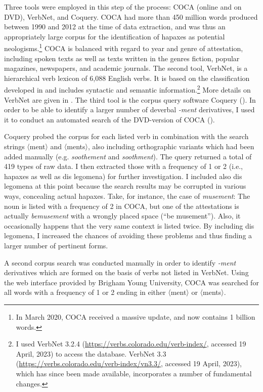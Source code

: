 Three tools were employed in this step of the process: COCA (online and on DVD), VerbNet, and Coquery.
COCA had more than 450 million words produced between 1990 and 2012 at the time of data extraction, and was thus an appropriately large corpus for the identification of hapaxes as potential neologisms.\footnote{In March 2020, COCA received a massive update, and now contains 1 billion words.} COCA is balanced with regard to year and genre of attestation, including spoken texts as well as texts written in the genres fiction, popular magazines, newspapers, and academic journals. 
The second tool, VerbNet, is a hierarchical verb lexicon of 6,088 English verbs. It is based on the classification developed in \citet{Levin.1993} and includes syntactic and semantic information.\footnote{I used VerbNet 3.2.4 (\url{https://verbs.colorado.edu/verb-index/}, accessed 19 April, 2023) to access the database. VerbNet 3.3 (\url{https://verbs.colorado.edu/verb-index/vn3.3/}, accessed 19 April, 2023), which has since been made available, incorporates a number of fundamental changes.} 
More details on VerbNet are given in .
The third tool is the corpus query software Coquery (\citealt{Kunter.2015}). In order to be able to identify a larger number of deverbal \textit{-ment} derivatives, I used it to conduct an automated search of the DVD-version of COCA (\citealt{Davies.2008b}).

Coquery probed the corpus for each listed verb in combination with the search strings 〈ment〉 and 〈ments〉, also including orthographic variants which had been added manually (e.g. \textit{soothement} and \textit{soothment}). The query returned a total of 419 types of raw data. I then extracted those with a frequency of 1 or 2 (i.e., hapaxes as well as dis legomena) for further investigation. I included also dis legomena at this point because the search results may be corrupted in various ways, concealing actual hapaxes. Take, for instance, the case of \textit{musement}: The noun is listed with a frequency of 2 in COCA, but one of the attestations is actually \textit{bemusement} with a wrongly placed space (``be musement''). Also, it occasionally happens that the very same context is listed twice. By including dis legomena, I increased the chances of avoiding these problems and thus finding a larger number of pertinent forms.

A second corpus search was conducted manually in order to identify \textit{-ment} derivatives which are formed on the basis of verbs not listed in VerbNet. 
Using the web interface provided by Brigham Young University, COCA was searched for all words with a frequency of 1 or 2 ending in either 〈ment〉 or 〈ments〉.    

